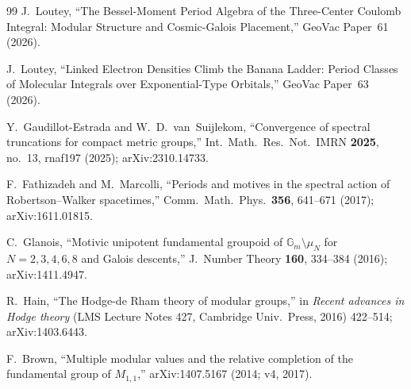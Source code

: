 \documentclass[aps,pra,twocolumn,superscriptaddress,longbibliography]{revtex4-2}
\begin{document}
\begin{thebibliography}{99}
J.~Loutey,
``The Bessel-Moment Period Algebra of the Three-Center Coulomb Integral: Modular Structure and Cosmic-Galois Placement,''
GeoVac Paper~61 (2026).

J.~Loutey,
``Linked Electron Densities Climb the Banana Ladder: Period Classes of Molecular Integrals over Exponential-Type Orbitals,''
GeoVac Paper~63 (2026).

Y.~Gaudillot-Estrada and W.~D.~van~Suijlekom,
``Convergence of spectral truncations for compact metric groups,''
Int.\ Math.\ Res.\ Not.\ IMRN \textbf{2025}, no.~13, rnaf197 (2025); arXiv:2310.14733.

F.~Fathizadeh and M.~Marcolli,
``Periods and motives in the spectral action of Robertson--Walker spacetimes,''
Comm.\ Math.\ Phys.\ \textbf{356}, 641--671 (2017); arXiv:1611.01815.

C.~Glanois,
``Motivic unipotent fundamental groupoid of $\mathbb{G}_m \setminus \mu_N$ for $N = 2, 3, 4, 6, 8$ and Galois descents,''
J.\ Number Theory \textbf{160}, 334--384 (2016); arXiv:1411.4947.

R.~Hain,
``The Hodge-de Rham theory of modular groups,''
in \emph{Recent advances in Hodge theory} (LMS Lecture Notes 427, Cambridge Univ.\ Press, 2016) 422--514; arXiv:1403.6443.

F.~Brown,
``Multiple modular values and the relative completion of the fundamental group of $M_{1,1}$,''
arXiv:1407.5167 (2014; v4, 2017).

\end{thebibliography}
\end{document}
